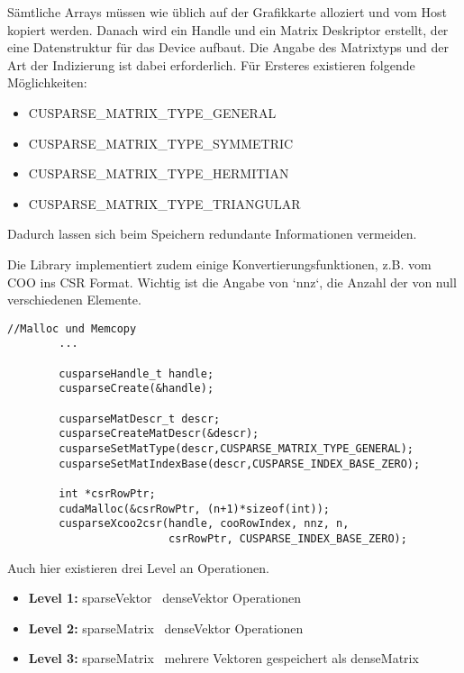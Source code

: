 		Sämtliche Arrays müssen wie üblich auf der Grafikkarte alloziert und vom Host kopiert werden. Danach wird ein \gls{Handle} und ein Matrix Deskriptor erstellt, der eine Datenstruktur für das Device aufbaut. Die Angabe des Matrixtyps und der Art der Indizierung ist dabei erforderlich. Für Ersteres existieren folgende Möglichkeiten:
		\begin{itemize}
			\item CUSPARSE{\_}MATRIX{\_}TYPE{\_}GENERAL
			\item CUSPARSE{\_}MATRIX{\_}TYPE{\_}SYMMETRIC
			\item CUSPARSE{\_}MATRIX{\_}TYPE{\_}HERMITIAN
			\item CUSPARSE{\_}MATRIX{\_}TYPE{\_}TRIANGULAR
		\end{itemize}

		Dadurch lassen sich beim Speichern redundante Informationen vermeiden.

		Die Library implementiert zudem einige Konvertierungsfunktionen, z.B. vom COO ins CSR Format. Wichtig ist die Angabe von \li`nnz`, die Anzahl der von null verschiedenen Elemente.

		\newpage		
		
		\begin{lstlisting}[caption=cuSPARSE: Initialisierung und Konvertierung]
		//Malloc und Memcopy
		...

		cusparseHandle_t handle;
		cusparseCreate(&handle);

		cusparseMatDescr_t descr;
		cusparseCreateMatDescr(&descr);
		cusparseSetMatType(descr,CUSPARSE_MATRIX_TYPE_GENERAL);
		cusparseSetMatIndexBase(descr,CUSPARSE_INDEX_BASE_ZERO);
    
		int *csrRowPtr; 
		cudaMalloc(&csrRowPtr, (n+1)*sizeof(int));
		cusparseXcoo2csr(handle, cooRowIndex, nnz, n, 
		                 csrRowPtr, CUSPARSE_INDEX_BASE_ZERO);
		\end{lstlisting}

		Auch hier existieren drei Level an Operationen.
		\begin{itemize}
			\item \textbf{Level 1:} sparseVektor \leftrightarrow\ denseVektor Operationen\\
			\item \textbf{Level 2:} sparseMatrix \leftrightarrow\ denseVektor Operationen\\
			\item \textbf{Level 3:} sparseMatrix \leftrightarrow\ mehrere Vektoren gespeichert als denseMatrix
		\end{itemize}
		
